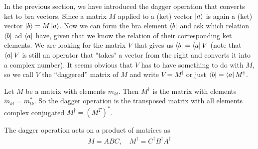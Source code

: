In the previous section, we have introduced the dagger operation that converts ket to bra vectors. Since a matrix $M$ applied to a (ket) vector $\ket{a}$ is again a (ket) vector $\ket{b} = M\ket{a}$.
Now we can form the bra element $\bra{b}$ and ask which relation $\bra{b}$ ad $\bra{a}$ have, given that we know the relation of their corresponding ket elements. We are looking for the matrix $V$ that gives us $\bra{b} = \bra{a}V$ (note that $\bra{a}V$ is still an operator that "takes" a vector from the right and converts it into a complex number). It seems obvious that $V$ has to have something to do with $M$, so we call $V$ the ``daggered'' matrix of $M$ and write $V=M^\dagger$ or just $\bra{b} = \bra{a}M^\dagger$.

\begin{def*}
Let $M$ be a matrix with elements $m_{kl}$. Then $M^\dagger$ is the matrix with elements $\tilde{m}_{kl} = m_{lk}^*$. So the dagger operation is the transposed matrix with all elements complex conjugated $M^\dagger = \left(M^T\right)^*$.

The dagger operation acts on a product of matrices as
\begin{align*}
    M = ABC, \quad M^\dagger = C^\dagger B^\dagger A^\dagger
\end{align*}
\end{def*}

